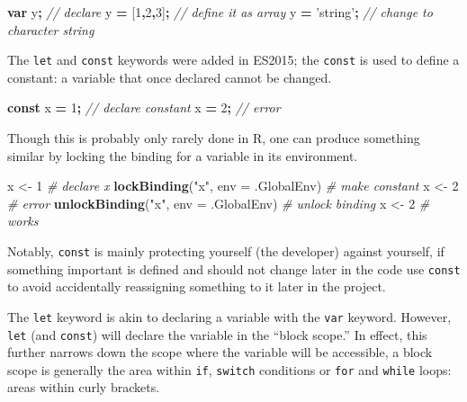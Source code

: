\documentclass[10pt,]{krantz}
\makeatletter
\newenvironment{Shaded}{\begin{snugshade}}{\end{snugshade}}
\newcommand{\CommentTok}[1]{\textcolor[rgb]{0.37,0.37,0.37}{\textit{#1}}}
\newcommand{\DataTypeTok}[1]{\textcolor[rgb]{0.27,0.27,0.27}{#1}}
\newcommand{\DecValTok}[1]{\textcolor[rgb]{0.06,0.06,0.06}{#1}}
\newcommand{\KeywordTok}[1]{\textcolor[rgb]{0.27,0.27,0.27}{\textbf{#1}}}
\newcommand{\NormalTok}[1]{#1}
\newcommand{\OperatorTok}[1]{\textcolor[rgb]{0.43,0.43,0.43}{\textbf{#1}}}
\newcommand{\StringTok}[1]{\textcolor[rgb]{0.5,0.5,0.5}{#1}}
\newenvironment{kframe}{%
\medskip{}
\setlength{\fboxsep}{.8em}
 \def\at@end@of@kframe{}%
 \ifinner\ifhmode%
  \def\at@end@of@kframe{\end{minipage}}%
  \begin{minipage}{\columnwidth}%
 \fi\fi%
 \def\FrameCommand##1{\hskip\@totalleftmargin \hskip-\fboxsep
 \colorbox{shadecolor}{##1}\hskip-\fboxsep
     \hskip-\linewidth \hskip-\@totalleftmargin \hskip\columnwidth}%
 \MakeFramed {\advance\hsize-\width
   \@totalleftmargin\z@ \linewidth\hsize
   \@setminipage}}%
 {\par\unskip\endMakeFramed%
 \at@end@of@kframe}
\renewenvironment{Shaded}{\begin{kframe}}{\end{kframe}}
\makeatother
\begin{document}
\begin{Shaded}
\begin{Highlighting}[]
\KeywordTok{var}\NormalTok{ y}\OperatorTok{;} \CommentTok{// declare }
\NormalTok{y }\OperatorTok{=}\NormalTok{ [}\DecValTok{1}\OperatorTok{,}\DecValTok{2}\OperatorTok{,}\DecValTok{3}\NormalTok{]}\OperatorTok{;} \CommentTok{// define it as array}
\NormalTok{y }\OperatorTok{=} \StringTok{'string'}\OperatorTok{;} \CommentTok{// change to character string}
\end{Highlighting}
\end{Shaded}

The \texttt{let} and \texttt{const} keywords were added in ES2015; the \texttt{const} is used to define a constant: a variable that once declared cannot be changed.

\begin{Shaded}
\begin{Highlighting}[]
\KeywordTok{const}\NormalTok{ x }\OperatorTok{=} \DecValTok{1}\OperatorTok{;} \CommentTok{// declare constant}
\NormalTok{x }\OperatorTok{=} \DecValTok{2}\OperatorTok{;} \CommentTok{// error}
\end{Highlighting}
\end{Shaded}

Though this is probably only rarely done in R, one can produce something similar by locking the binding for a variable in its environment.

\begin{Shaded}
\begin{Highlighting}[]
\NormalTok{x <-}\StringTok{ }\DecValTok{1} \CommentTok{# declare x}
\KeywordTok{lockBinding}\NormalTok{(}\StringTok{"x"}\NormalTok{, }\DataTypeTok{env =}\NormalTok{ .GlobalEnv) }\CommentTok{# make constant}
\NormalTok{x <-}\StringTok{ }\DecValTok{2} \CommentTok{# error}
\KeywordTok{unlockBinding}\NormalTok{(}\StringTok{"x"}\NormalTok{, }\DataTypeTok{env =}\NormalTok{ .GlobalEnv) }\CommentTok{# unlock binding}
\NormalTok{x <-}\StringTok{ }\DecValTok{2} \CommentTok{# works}
\end{Highlighting}
\end{Shaded}

Notably, \texttt{const} is mainly protecting yourself (the developer) against yourself, if something important is defined and should not change later in the code use \texttt{const} to avoid accidentally reassigning something to it later in the project.

The \texttt{let} keyword is akin to declaring a variable with the \texttt{var} keyword. However, \texttt{let} (and \texttt{const}) will declare the variable in the ``block scope.'' In effect, this further narrows down the scope where the variable will be accessible, a block scope is generally the area within \texttt{if}, \texttt{switch} conditions or \texttt{for} and \texttt{while} loops: areas within curly brackets.
\end{document}

